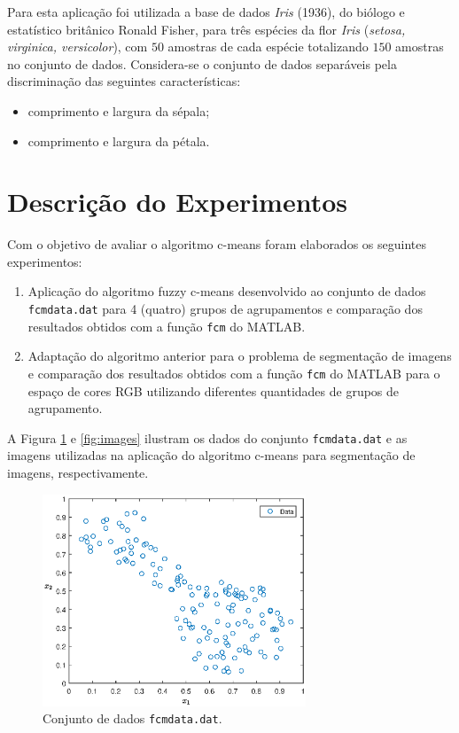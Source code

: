 \documentclass[12pt,a4paper]{article}
\numberwithin{equation}{section}
\begin{document}
Para esta aplicação foi utilizada a base de dados \textit{Iris} (1936), do biólogo e estatístico britânico Ronald Fisher, para três espécies da flor \textit{Iris} (\textit{setosa, virginica, versicolor}), com $50$ amostras de cada espécie totalizando $150$ amostras no conjunto de dados. Considera-se o conjunto de dados separáveis pela discriminação das seguintes características:

\begin{itemize}
\item comprimento e largura da sépala;
\item comprimento e largura da pétala.
\end{itemize}

\section{Descrição do Experimentos}

Com o objetivo de avaliar o algoritmo c-means foram elaborados os seguintes experimentos:

\begin{enumerate}
	\item Aplicação do algoritmo fuzzy c-means desenvolvido ao conjunto de dados \texttt{fcmdata.dat} para 4 (quatro) grupos de agrupamentos e comparação dos resultados obtidos com a função \texttt{fcm} do MATLAB.
	\item Adaptação do algoritmo anterior para o problema de segmentação de imagens e comparação dos resultados obtidos com a função \texttt{fcm} do MATLAB para o espaço de cores RGB utilizando diferentes quantidades de grupos de agrupamento.
\end{enumerate}

A Figura \ref{fig:fcmdata} e \ref{fig:images} ilustram os dados do conjunto \texttt{fcmdata.dat} e as imagens utilizadas na aplicação do algoritmo c-means para segmentação de imagens, respectivamente.

\begin{figure}[ht!]
	\centering
	\includegraphics[width=0.7\textwidth]{figures/data.eps}
	\caption{Conjunto de dados \texttt{fcmdata.dat}.}
	\label{fig:fcmdata}
\end{figure}
\end{document}
